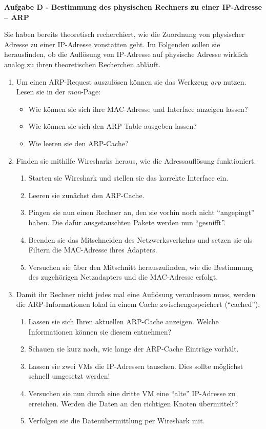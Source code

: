 \documentclass[paper=a4,fontsize=11pt]{scrartcl}%
\begin{document}
\begin{center}
\Large{\textbf{Aufgabe D - Bestimmung des physischen Rechners zu einer IP-Adresse -- ARP}}
\end{center}\vskip0.25in
Sie haben bereits theoretisch recherchiert, wie die Zuordnung von physischer Adresse zu einer IP-Adresse vonstatten geht. Im Folgenden sollen sie herausfinden, ob die Auflösung von IP-Adresse auf physische Adresse wirklich analog zu ihren theoretischen Recherchen abläuft.
\begin{enumerate}
	\item Um einen ARP-Request auszulösen können sie das Werkzeug \emph{arp} nutzen. Lesen sie in der \emph{man}-Page:
	\begin{itemize}
		\item Wie können sie sich ihre MAC-Adresse und Interface anzeigen lassen?
		\item Wie können sie sich den ARP-Table ausgeben lassen?
		\item Wie leeren sie den ARP-Cache?
	\end{itemize}
	\item Finden sie mithilfe Wiresharks heraus, wie die Adressauflösung funktioniert.
		\begin{enumerate}
			\item Starten sie Wireshark und stellen sie das korrekte Interface ein.
			\item Leeren sie zunächst den ARP-Cache.
			\item Pingen sie nun einen Rechner an, den sie vorhin noch nicht \enquote{angepingt} haben. Die dafür ausgetauschten Pakete werden nun \enquote{gesnifft}.
			\item Beenden sie das Mitschneiden des Netzwerksverkehrs und setzen sie als Filtern die MAC-Adresse ihres Adapters.
			\item Versuchen sie über den Mitschnitt herauszufinden, wie die Bestimmung des zugehörigen Netzadapters und die MAC-Adresse erfolgt.
		\end{enumerate}
	\item Damit ihr Rechner nicht jedes mal eine Auflösung veranlassen muss, werden die ARP-Informationen lokal in einem Cache zwischengespeichert (\enquote{cached}).
\begin{enumerate}
	\item Lassen sie sich Ihren aktuellen ARP-Cache anzeigen. Welche Informationen können sie diesem entnehmen?
	\item Schauen sie kurz nach, wie lange der ARP-Cache Einträge vorhält.
	\item Lassen sie zwei VMs die IP-Adressen tauschen. Dies sollte möglichst schnell umgesetzt werden!
	\item Versuchen sie nun durch eine dritte VM eine \enquote{alte} IP-Adresse zu erreichen. Werden die Daten an den richtigen Knoten übermittelt?
	\item Verfolgen sie die Datenübermittlung per Wireshark mit.
\end{enumerate}
\end{enumerate}
\end{document}
